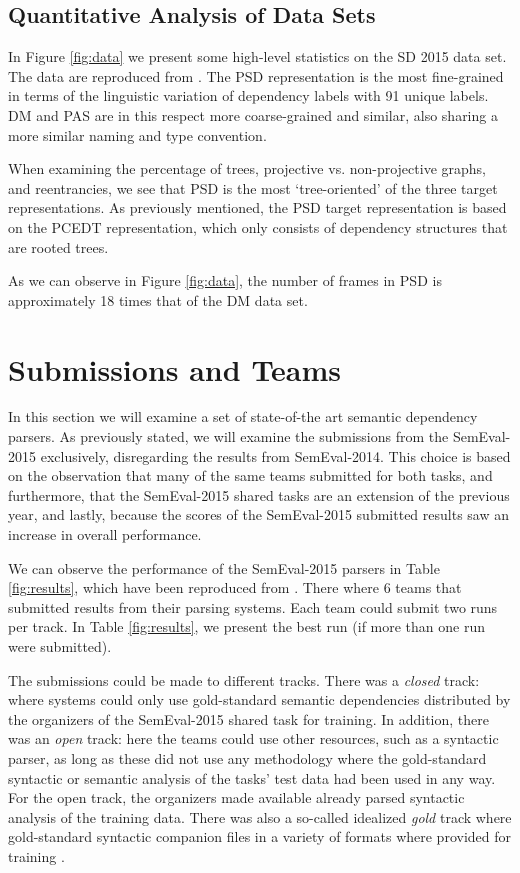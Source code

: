 \subsection{Quantitative Analysis of Data Sets}
\label{sec:quantitative}

In Figure \ref{fig:data} we present some high-level statistics on the SD 2015 data set. The data are reproduced from . The PSD representation is the most fine-grained in terms of the linguistic variation of dependency labels with 91 unique labels. DM and PAS are in this respect more coarse-grained and similar, also sharing a more similar naming and type convention.

When examining the percentage of trees, projective vs. non-projective graphs, and reentrancies, we see that PSD is the most `tree-oriented' of the three target representations. As previously mentioned, the PSD target representation is based on the PCEDT representation, which only consists of dependency structures that are rooted trees. 

As we can observe in Figure \ref{fig:data}, the number of frames in PSD is approximately 18 times that of the DM data set. 

\section{Submissions and Teams}
\label{sec:parsers}

In this section we will examine a set of state-of-the art semantic dependency parsers. As previously stated, we will examine the submissions from the SemEval-2015 exclusively, disregarding the results from SemEval-2014. This choice is based on the observation that many of the same teams submitted for both tasks, and furthermore, that the SemEval-2015 shared tasks are an extension of the previous year, and lastly, because the scores of the SemEval-2015 submitted results saw an increase in overall performance.

We can observe the performance of the SemEval-2015 parsers in Table \ref{fig:results}, which have been reproduced from . There where 6 teams that submitted results from their parsing systems. Each team could submit two runs per track. In Table \ref{fig:results}, we present the best run (if more than one run were submitted).

The submissions could be made to different tracks. There was a \textit{closed} track: where systems could only use gold-standard semantic dependencies distributed by the organizers of the SemEval-2015 shared task for training. In addition, there was an \textit{open} track: here the teams could use other resources, such as a syntactic parser, as long as these did not use any methodology where the gold-standard syntactic or semantic analysis of the tasks' test data had been used in any way. For the open track, the organizers made available already parsed syntactic analysis of the training data. There was also a so-called idealized \textit{gold} track where gold-standard syntactic companion files in a variety of formats where provided for training \cite{Oepen:15}.


